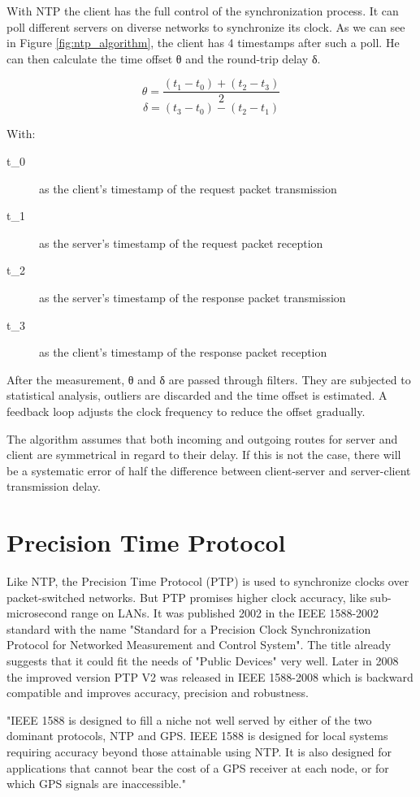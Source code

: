 With NTP the client has the full control of the synchronization process. It can poll different servers on diverse networks to synchronize its clock. As we can see in Figure \ref{fig:ntp_algorithm}, the client has 4 timestamps after such a poll. He can then calculate the time offset θ and the round-trip delay δ.

\[ \theta = \frac{(t_1 - t_0) + (t_2 - t_3)}{2} \]
\[ \delta = (t_3 - t_0) - (t_2 - t_1) \]

With:
\begin{description}
    \item[t_0] as the client's timestamp of the request packet transmission
    \item[t_1] as the server's timestamp of the request packet reception
    \item[t_2] as the server's timestamp of the response packet transmission
    \item[t_3] as the client's timestamp of the response packet reception
\end{description}

After the measurement, θ and δ are passed through filters. They are subjected to statistical analysis, outliers are discarded and the time offset is estimated. A feedback loop adjusts the clock frequency to reduce the offset gradually.

The algorithm assumes that both incoming and outgoing routes for server and client are symmetrical in regard to their delay. If this is not the case, there will be a systematic error of half the difference between client-server and server-client transmission delay.

\section{Precision Time Protocol}

Like NTP, the Precision Time Protocol (PTP) is used to synchronize clocks over packet-switched networks.\cite{eidson_2005,eidson_2006} But PTP promises higher clock accuracy, like sub-microsecond range on LANs. It was published 2002 in the IEEE 1588-2002 standard with the name "Standard for a Precision Clock Synchronization Protocol for Networked Measurement and Control System". The title already suggests that it could fit the needs of "Public Devices" very well. Later in 2008 the improved version PTP V2 was released in IEEE 1588-2008 which is backward compatible and improves accuracy, precision and robustness.

"IEEE 1588 is designed to fill a niche not well served by either of the two dominant protocols, NTP and GPS. IEEE 1588 is designed for local systems requiring accuracy beyond those attainable using NTP. It is also designed for applications that cannot bear the cost of a GPS receiver at each node, or for which GPS signals are inaccessible."\cite{eidson_book}

